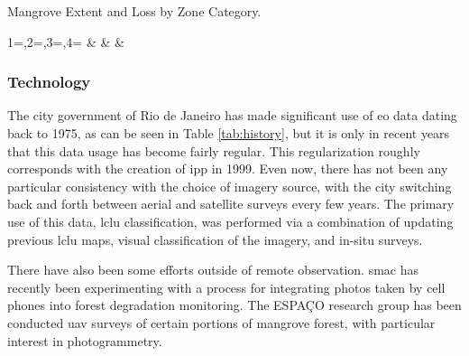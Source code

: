 \begin{table}[!htb]\centering
	\caption[Mangrove Extent and Loss by Zone Category]{Mangrove Extent and Loss by Zone Category.} \label{tab:loss_area_zone}
	\fontsize{8}{10}\selectfont
		{1=\year,2=\type,3=\platform,4=\agency}
		{\textbf{\year} & \type & \platform & \agency}
\end{table}



%


\subsubsection{Technology} 

The city government of Rio de Janeiro has made significant use of \ac{eo} data dating back to 1975, as can be seen in Table \ref{tab:history}, but it is only in recent years that this data usage has become fairly regular. This regularization roughly corresponds with the creation of \ac{ipp} in 1999. Even now, there has not been any particular consistency with the choice of imagery source, with the city switching back and forth between aerial and satellite surveys every few years. The primary use of this data, \acf{lclu} classification, was performed via a combination of updating previous \ac{lclu} maps, visual classification of the imagery, and in-situ surveys.

There have also been some efforts outside of remote observation. \ac{smac} has recently been experimenting with a process for integrating photos taken by cell phones into forest degradation monitoring. The ESPAÇO research group has been conducted \ac{uav} surveys of certain portions of mangrove forest, with particular interest in photogrammetry. 

